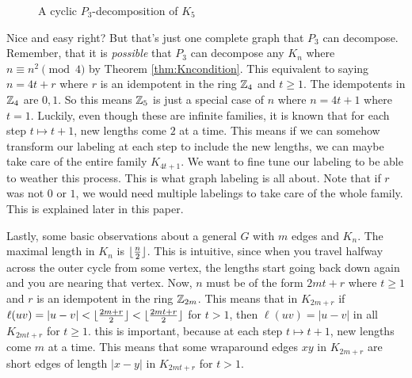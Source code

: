 \begin{figure}[H]
\begin{center}
  \end{center}
  \caption{A cyclic $P_{3}$-decomposition of $K_{5}$}
  \label{fig:K5colordecomp}
\end{figure}

Nice and easy right? But that's just one complete graph that $P_{3}$ can decompose. Remember, that it is \textit{possible} that $P_{3}$ can decompose any $K_{n}$ where $n\equiv n^{2} \pmod{4}$ by Theorem \ref{thm:Kncondition}. This equivalent to saying $n=4t+r$ where $r$ is an idempotent in the ring $\mathbb{Z}_{4}$ and $t\geq 1$. The idempotents in $\mathbb{Z}_{4}$ are $0,1$. So this means $\mathbb{Z}_{5}$ is just a special case of $n$ where $n=4t+1$ where $t=1$. Luckily, even though these are infinite families, it is known that for each step $t\mapsto t+1$, new lengths come $2$ at a time. This means if we can somehow transform our labeling at each step to include the new lengths, we can maybe take care of the entire family $K_{4t+1}$. We want to fine tune our labeling to be able to weather this process. This is what graph labeling is all about. Note that if $r$ was not $0$ or $1$, we would need multiple labelings to take care of the whole family. This is explained later in this paper.

Lastly, some basic observations about a general $G$ with $m$ edges and $K_{n}$. The maximal length in $K_{n}$ is $\lfloor\frac{n}{2}\rfloor$. This is intuitive, since when you travel halfway across the outer cycle from some vertex, the lengths start going back down again and you are nearing that vertex. Now, $n$ must be of the form $2mt+r$ where $t\geq 1$ and $r$ is an idempotent in the ring $\mathbb{Z}_{2m}$. This means that in $K_{2m+r}$ if $\ell(uv)=|u-v|<\lfloor\frac{2m+r}{2}\rfloor<\lfloor\frac{2mt+r}{2}\rfloor$ for $t>1$, then $\ell(uv)=|u-v|$ in all $K_{2mt+r}$ for $t\geq 1$. this is important, because at each step $t\mapsto t+1$, new lengths come $m$ at a time. This means that some wraparound edges $xy$ in $K_{2m+r}$ are short edges of length $|x-y|$ in $K_{2mt+r}$ for $t>1$.

